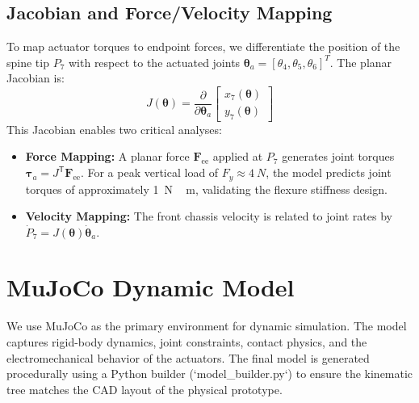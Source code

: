 \documentclass[11pt, a4paper]{article}
\begin{document}
\subsection{Jacobian and Force/Velocity Mapping}
To map actuator torques to endpoint forces, we differentiate the position of the spine tip $P_7$ with respect to the actuated joints $\boldsymbol{\theta}_a = [\theta_4, \theta_5, \theta_6]^T$. The planar Jacobian is:
\begin{equation}
    J(\boldsymbol{\theta}) = \frac{\partial}{\partial\boldsymbol{\theta}_a} \begin{bmatrix} x_7(\boldsymbol{\theta}) \\ y_7(\boldsymbol{\theta}) \end{bmatrix}
\end{equation}
This Jacobian enables two critical analyses:
\begin{itemize}
    \item \textbf{Force Mapping:} A planar force $\mathbf{F}_{\text{ee}}$ applied at $P_7$ generates joint torques $\boldsymbol{\tau}_a = J^{\mathsf{T}} \mathbf{F}_{\text{ee}}$. For a peak vertical load of $F_y \approx \SI{4}{N}$, the model predicts joint torques of approximately \SI{1}{N\,m}, validating the flexure stiffness design.
    \item \textbf{Velocity Mapping:} The front chassis velocity is related to joint rates by $\dot{P}_7 = J(\boldsymbol{\theta}) \dot{\boldsymbol{\theta}}_a$.
\end{itemize}


\section{MuJoCo Dynamic Model} \label{sec:mujoco-model}

We use MuJoCo as the primary environment for dynamic simulation. The model captures rigid-body dynamics, joint constraints, contact physics, and the electromechanical behavior of the actuators. The final model is generated procedurally using a Python builder (`model\_builder.py`) to ensure the kinematic tree matches the CAD layout of the physical prototype.
\end{document}
